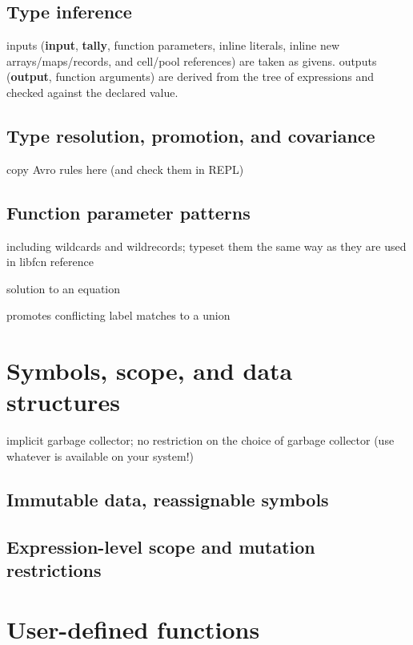 \documentclass{article}
\newcommand{\PFAc}{\ttfamily\bfseries}
\theoremstyle{definition}
\begin{document}
\hypertarget{hsec:type-inference}{}
\subsection{Type inference}
\label{sec:type-inference}

inputs ({\PFAc input}, {\PFAc tally}, function parameters, inline literals, inline new arrays/maps/records, and cell/pool references) are taken as givens.  outputs ({\PFAc output}, function arguments) are derived from the tree of expressions and checked against the declared value.

\subsection{Type resolution, promotion, and covariance}

copy Avro rules here (and check them in REPL)

\subsection{Function parameter patterns}

including wildcards and wildrecords; typeset them the same way as they are used in libfcn reference

solution to an equation

promotes conflicting label matches to a union

\pagebreak

\section{Symbols, scope, and data structures}

implicit garbage collector; no restriction on the choice of garbage collector (use whatever is available on your system!)

\hypertarget{hsec:immutable}{}
\subsection{Immutable data, reassignable symbols}
\label{sec:immutable}

\subsection{Expression-level scope and mutation restrictions}

\pagebreak

\section{User-defined functions}
\end{document}
